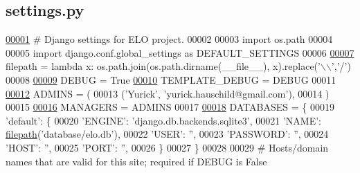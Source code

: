\hypertarget{settings_8py_source}{}\subsection{settings.\+py}
\label{settings_8py_source}

\begin{DoxyCode}
\hypertarget{settings_8py_source_l00001}{}\hyperlink{namespaceELO_1_1settings}{00001} \textcolor{comment}{# Django settings for ELO project.}
00002 
00003 \textcolor{keyword}{import} os.path
00004 
00005 \textcolor{keyword}{import} django.conf.global\_settings \textcolor{keyword}{as} DEFAULT\_SETTINGS
00006 
\hypertarget{settings_8py_source_l00007}{}\hyperlink{namespaceELO_1_1settings_a7730264ddd478343e0f282f36d4a5ab4}{00007} filepath = \textcolor{keyword}{lambda} x: os.path.join(os.path.dirname(\_\_file\_\_), x).replace(\textcolor{stringliteral}{'\(\backslash\)\(\backslash\)'},\textcolor{stringliteral}{'/'})
00008 
\hypertarget{settings_8py_source_l00009}{}\hyperlink{namespaceELO_1_1settings_a62f457ac29cc6f3e85282c71ce3b4f26}{00009} DEBUG = \textcolor{keyword}{True}
\hypertarget{settings_8py_source_l00010}{}\hyperlink{namespaceELO_1_1settings_a014930e0bf77feccc65c20212593381e}{00010} TEMPLATE\_DEBUG = DEBUG
00011 
\hypertarget{settings_8py_source_l00012}{}\hyperlink{namespaceELO_1_1settings_a051220bd8105ba13b2720df11c1950ba}{00012} ADMINS = (
00013     (\textcolor{stringliteral}{'Yurick'}, \textcolor{stringliteral}{'yurick.hauschild@gmail.com'}),
00014 )
00015 
\hypertarget{settings_8py_source_l00016}{}\hyperlink{namespaceELO_1_1settings_a43e8826e0b24e337065b4975f3eace4c}{00016} MANAGERS = ADMINS
00017 
\hypertarget{settings_8py_source_l00018}{}\hyperlink{namespaceELO_1_1settings_a91ed1425b7f1cf041960832ce5b54b6e}{00018} DATABASES = \{
00019     \textcolor{stringliteral}{'default'}: \{
00020         \textcolor{stringliteral}{'ENGINE'}: \textcolor{stringliteral}{'django.db.backends.sqlite3'}, 
00021         \textcolor{stringliteral}{'NAME'}: \hyperlink{namespaceELO_1_1settings_a7730264ddd478343e0f282f36d4a5ab4}{filepath}(\textcolor{stringliteral}{'database/elo.db'}),
00022         \textcolor{stringliteral}{'USER'}: \textcolor{stringliteral}{''},
00023         \textcolor{stringliteral}{'PASSWORD'}: \textcolor{stringliteral}{''},
00024         \textcolor{stringliteral}{'HOST'}: \textcolor{stringliteral}{''},
00025         \textcolor{stringliteral}{'PORT'}: \textcolor{stringliteral}{''},
00026     \}
00027 \}
00028 
00029 \textcolor{comment}{# Hosts/domain names that are valid for this site; required if DEBUG is False}

\end{DoxyCode}
